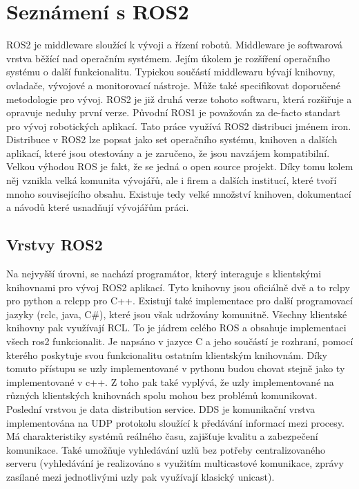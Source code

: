 \section{Seznámení s ROS2}
ROS2 je middleware sloužící k vývoji a řízení robotů. Middleware je softwarová vrstva běžící nad operačním systémem. Jejím úkolem je rozšíření operačního systému o další funkcionalitu. Typickou součástí middlewaru bývají knihovny, ovladače, vývojové a monitorovací nástroje. Může také specifikovat doporučené metodologie pro vývoj. ROS2 je již druhá verze tohoto softwaru, která rozšiřuje a opravuje neduhy první verze. Původní ROS1 je považován za de-facto standart pro vývoj robotických aplikací.
Tato práce využívá ROS2 distribuci jménem iron. Distribuce v ROS2 lze popsat jako set operačního systému, knihoven a dalších aplikací, které jsou otestovány a je zaručeno, že jsou navzájem kompatibilní. Velkou výhodou ROS je fakt, že se jedná o open source projekt. Díky tomu kolem něj vznikla velká komunita vývojářů, ale i firem a dalších institucí, které tvoří mnoho souvisejícího obsahu. Existuje tedy velké množství knihoven, dokumentací a návodů které usnadňují vývojářům práci. \cite{ros2_introduction}

\subsection*{Vrstvy ROS2}
Na nejvyšší úrovni, se nachází programátor, který interaguje s klientskými knihovnami pro vývoj ROS2 aplikací. Tyto knihovny jsou oficiálně dvě a to rclpy pro python a rclcpp pro C++. Existují také implementace pro další programovací jazyky (rclc, java, C\#), které jsou však udržovány komunitně. Všechny klientské knihovny pak využívají RCL. To je jádrem celého ROS a obsahuje implementaci všech ros2 funkcionalit. Je napsáno v jazyce C a jeho součástí je rozhraní, pomocí kterého poskytuje svou funkcionalitu ostatním klientským knihovnám. Díky tomuto přístupu se uzly implementované v pythonu budou chovat stejně jako ty implementované v c++. Z toho pak také vyplývá, že uzly implementované na různých klientských knihovnách spolu mohou bez problémů komunikovat.
Poslední vrstvou je data distribution service. DDS je komunikační vrstva implementována na UDP protokolu sloužící k předávání informací mezi procesy. Má charakteristiky systémů reálného času, zajišťuje kvalitu a zabezpečení komunikace. Také umožňuje vyhledávání uzlů bez potřeby centralizovaného serveru (vyhledávání je realizováno s využitím multicastové komunikace, zprávy zasílané mezi jednotlivými uzly pak využívají klasický unicast). \cite{ros2_introduction}

